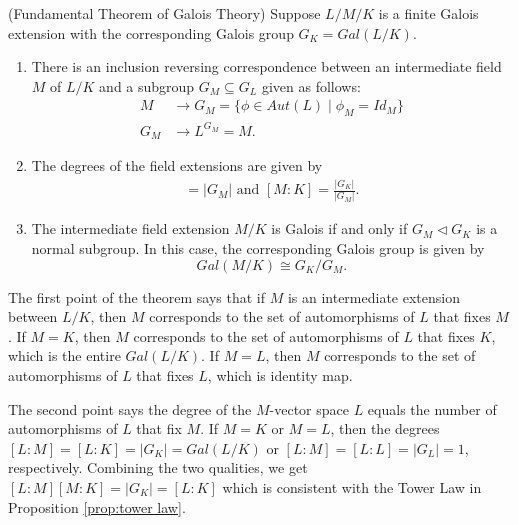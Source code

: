 \documentclass[../main.tex]{subfiles}
\begin{document}
\reversemarginpar
{}
\begin{theorem}(Fundamental Theorem of Galois Theory)
Suppose $L/M/K$ is a finite Galois extension with the corresponding Galois group $G_K=Gal(L/K)$. 
\begin{enumerate}
    \item There is an inclusion reversing correspondence between an intermediate field $M$ of $L/K$ and a subgroup $G_M \subseteq G_L$ given as follows: 
    \begin{align*}
        M &\rightarrow G_M = \{\phi \in Aut(L) \mid \phi_M = Id_M\} \\
        G_M &\rightarrow L^{G_M}=M.
    \end{align*}
    
    \item The degrees of the field extensions are given by 
    \begin{align*}
        [L:M] = |G_M| \text{ and }
        [M:K] = \frac{|G_K|}{|G_M|}.
    \end{align*}
    
    \item The intermediate field extension $M/K$ is Galois if and only if $G_M \triangleleft G_K$ is a normal subgroup.  In this case, the corresponding Galois group is given by 
    \begin{equation*}
        Gal(M/K) \cong G_K/G_M.
    \end{equation*}
\end{enumerate}
\end{theorem}

The first point of the theorem says that if $M$ is an intermediate extension between $L/K$, then $M$ corresponds to the set of automorphisms of $L$ that fixes $M$. If $M=K$, then $M$ corresponds to the set of automorphisms of $L$ that fixes $K$, which is the entire $Gal(L/K)$. If $M=L$, then $M$ corresponds to the set of automorphisms of $L$ that fixes $L$, which is identity map. 

The second point says the degree of the $M$-vector space $L$ equals the number of automorphisms of $L$ that fix $M$. If $M=K$ or $M=L$, then the degrees $[L:M]=[L:K]=|G_K|=Gal(L/K)$ or $[L:M]=[L:L]=|G_L|=1$, respectively.
Combining the two qualities, we get $[L:M][M:K]=|G_K|=[L:K]$ which is consistent with the Tower Law in Proposition \ref{prop:tower law}.
\end{document}

